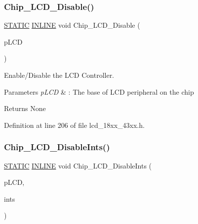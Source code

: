 \subsubsection{\texorpdfstring{Chip\+\_\+\+L\+C\+D\+\_\+\+Disable()}{Chip\_LCD\_Disable()}}
{\footnotesize\ttfamily \hyperlink{group___l_p_c___types___public___macros_ga10b2d890d871e1489bb02b7e70d9bdfb}{S\+T\+A\+T\+IC} \hyperlink{spifi__18xx__43xx_8h_a2eb6f9e0395b47b8d5e3eeae4fe0c116}{I\+N\+L\+I\+NE} void Chip\+\_\+\+L\+C\+D\+\_\+\+Disable (\begin{DoxyParamCaption}\item[{\hyperlink{struct_l_p_c___l_c_d___t}{L\+P\+C\+\_\+\+L\+C\+D\+\_\+T} $\ast$}]{p\+L\+CD }\end{DoxyParamCaption})}



Enable/\+Disable the L\+CD Controller. 


\begin{DoxyParams}{Parameters}
{\em p\+L\+CD} & \+: The base of L\+CD peripheral on the chip \\
\hline
\end{DoxyParams}
\begin{DoxyReturn}{Returns}
None 
\end{DoxyReturn}


Definition at line 206 of file lcd\+\_\+18xx\+\_\+43xx.\+h.

\mbox{\label{group___l_c_d__18_x_x__43_x_x_ga98d2df2f7630bce1ca9e6af19f8c8426}} 
\subsubsection{\texorpdfstring{Chip\+\_\+\+L\+C\+D\+\_\+\+Disable\+Ints()}{Chip\_LCD\_DisableInts()}}
{\footnotesize\ttfamily \hyperlink{group___l_p_c___types___public___macros_ga10b2d890d871e1489bb02b7e70d9bdfb}{S\+T\+A\+T\+IC} \hyperlink{spifi__18xx__43xx_8h_a2eb6f9e0395b47b8d5e3eeae4fe0c116}{I\+N\+L\+I\+NE} void Chip\+\_\+\+L\+C\+D\+\_\+\+Disable\+Ints (\begin{DoxyParamCaption}\item[{\hyperlink{struct_l_p_c___l_c_d___t}{L\+P\+C\+\_\+\+L\+C\+D\+\_\+T} $\ast$}]{p\+L\+CD,  }\item[{uint32\+\_\+t}]{ints }\end{DoxyParamCaption})}



